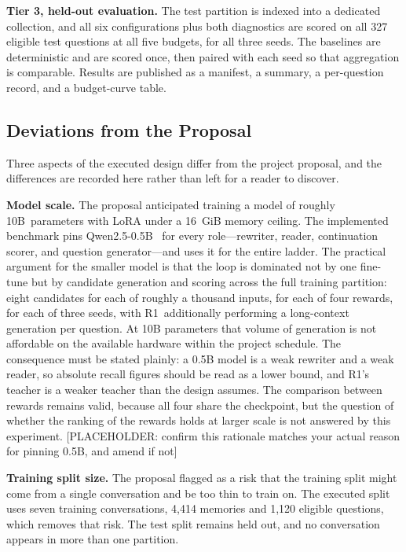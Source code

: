 \documentclass[12pt,letterpaper,oneside]{report}
\newcommand{\ph}[1]{\textcolor{phtext}{[\textsf{\footnotesize PLACEHOLDER: #1}]}}
\newcommand{\Ra}{R1}
\begin{document}
\textbf{Tier 3, held-out evaluation.} The test partition is indexed into a
dedicated collection, and all six configurations plus both diagnostics are
scored on all 327 eligible test questions at all five budgets, for all three
seeds. The baselines are deterministic and are scored once, then paired with
each seed so that aggregation is comparable. Results are published as a
manifest, a summary, a per-question record, and a budget-curve table.

\subsection{Deviations from the Proposal}
\label{sec:deviations}

Three aspects of the executed design differ from the project proposal, and the
differences are recorded here rather than left for a reader to discover.

\textbf{Model scale.} The proposal anticipated training a model of roughly
10B~parameters with LoRA under a 16~GiB memory ceiling. The implemented
benchmark pins Qwen2.5-0.5B~\cite{qwen} for every role---rewriter, reader,
continuation scorer, and question generator---and uses it for the entire
ladder. The practical argument for the smaller model is that the loop is
dominated not by one fine-tune but by candidate generation and scoring across
the full training partition: eight candidates for each of roughly a thousand
inputs, for each of four rewards, for each of three seeds, with \Ra\
additionally performing a long-context generation per question. At 10B
parameters that volume of generation is not affordable on the available
hardware within the project schedule. The consequence must be stated plainly: a
0.5B model is a weak rewriter and a weak reader, so absolute recall figures
should be read as a lower bound, and \Ra's teacher is a weaker teacher than the
design assumes. The comparison between rewards remains valid, because all four
share the checkpoint, but the question of whether the ranking of the rewards
holds at larger scale is not answered by this experiment.
\ph{confirm this rationale matches your actual reason for pinning 0.5B, and
amend if not}

\textbf{Training split size.} The proposal flagged as a risk that the training
split might come from a single conversation and be too thin to train on. The
executed split uses seven training conversations, 4,414 memories and 1,120
eligible questions, which removes that risk. The test split remains held out,
and no conversation appears in more than one partition.
\end{document}
